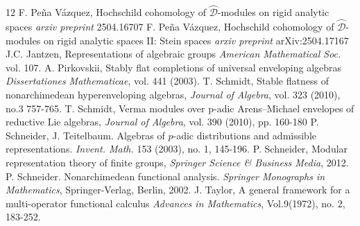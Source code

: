 \documentclass{amsart}
\newcommand{\D}{\mathcal{D}}
\begin{document}
\begin{thebibliography}{12}
 F. Peña Vázquez, Hochschild cohomology of $\wideparen{\D}$-modules on rigid analytic spaces \emph{arxiv preprint } 2504.16707
 F. Peña Vázquez, Hochschild cohomology of $\wideparen{\D}$-modules on rigid analytic spaces II: Stein spaces \emph{arxiv preprint }  arXiv:2504.17167
 J.C. Jantzen, Representations of algebraic groups \emph{American Mathematical Soc.} vol. 107.
A. Pirkovskii, Stably flat completions of universal enveloping algebras \emph{Dissertationes Mathematicae}, vol. 441 (2003).
 T. Schmidt, Stable flatness of nonarchimedean hyperenveloping algebras, \emph{Journal of Algebra}, vol. 323 (2010), no.3 757-765.
 T. Schmidt, Verma modules over p-adic Arens–Michael envelopes of reductive Lie algebras, \emph{Journal of Algebra}, vol. 390 (2010), pp. 160-180
 P. Schneider, J. Teitelbaum. Algebras of $p$-adic distributions and admissible representations. \emph{Invent. Math.} 153 (2003), no. 1, 145-196.
 P. Schneider,
 Modular representation theory of finite groups, \emph{Springer Science \& Business Media}, 2012.
 P. Schneider. Nonarchimedean functional analysis. \emph{Springer Monographs in Mathematics}, Springer-Verlag, Berlin, 2002.
 J. Taylor, A general framework for a multi-operator functional calculus \emph{Advances in Mathematics}, Vol.9(1972), no. 2, 183-252.
\end{thebibliography}
\end{document}
